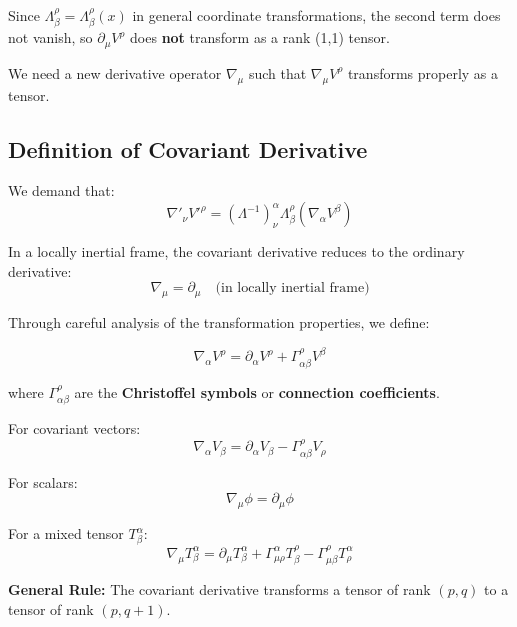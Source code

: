\documentclass[11pt,a4paper]{article}
\begin{document}
Since $\Lambda^\rho_\beta = \Lambda^\rho_\beta(x)$ in general coordinate transformations, the second term does not vanish, so $\partial_\mu V^\rho$ does \textbf{not} transform as a rank (1,1) tensor.

We need a new derivative operator $\nabla_\mu$ such that $\nabla_\mu V^\rho$ transforms properly as a tensor.

\subsection{Definition of Covariant Derivative}

We demand that:
\begin{equation}
\nabla'_\nu V'^\rho = (\Lambda^{-1})^\alpha_\nu \Lambda^\rho_\beta (\nabla_\alpha V^\beta)
\end{equation}

In a locally inertial frame, the covariant derivative reduces to the ordinary derivative:
\begin{equation}
\nabla_\mu = \partial_\mu \quad \text{(in locally inertial frame)}
\end{equation}

Through careful analysis of the transformation properties, we define:

\begin{equation}
\boxed{\nabla_\alpha V^\rho = \partial_\alpha V^\rho + \Gamma^\rho_{\alpha\beta} V^\beta}
\end{equation}

where $\Gamma^\rho_{\alpha\beta}$ are the \textbf{Christoffel symbols} or \textbf{connection coefficients}.

For covariant vectors:
\begin{equation}
\boxed{\nabla_\alpha V_\beta = \partial_\alpha V_\beta - \Gamma^\rho_{\alpha\beta} V_\rho}
\end{equation}

For scalars:
\begin{equation}
\nabla_\mu \phi = \partial_\mu \phi
\end{equation}

For a mixed tensor $T^\alpha_\beta$:
\begin{equation}
\nabla_\mu T^\alpha_\beta = \partial_\mu T^\alpha_\beta + \Gamma^\alpha_{\mu\rho} T^\rho_\beta - \Gamma^\rho_{\mu\beta} T^\alpha_\rho
\end{equation}

\textbf{General Rule:} The covariant derivative transforms a tensor of rank $(p,q)$ to a tensor of rank $(p, q+1)$.
\end{document}
